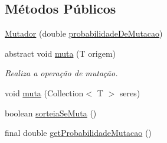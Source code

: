\subsection*{Métodos Públicos}
\begin{DoxyCompactItemize}
\item 
\hyperlink{classic_1_1populacional_1_1algoritmo_1_1operadores_1_1_mutador_3_01_t_01extends_01_ser_01_4_a91f0ac5d3d47ccca5fe3b629bb8db51e}{Mutador} (double \hyperlink{classic_1_1populacional_1_1algoritmo_1_1operadores_1_1_mutador_3_01_t_01extends_01_ser_01_4_a1ef75bbeff32bd2bf0b56c8b2ad86c60}{probabilidade\-De\-Mutacao})
\item 
abstract void \hyperlink{classic_1_1populacional_1_1algoritmo_1_1operadores_1_1_mutador_3_01_t_01extends_01_ser_01_4_a69073efced7c28f34fc78a1406997f68}{muta} (T origem)
\begin{DoxyCompactList}\small\item\em Realiza a operação de mutação. \end{DoxyCompactList}\item 
void \hyperlink{classic_1_1populacional_1_1algoritmo_1_1operadores_1_1_mutador_3_01_t_01extends_01_ser_01_4_a618c8c12d4f4c6fa0a1165b6b255451c}{muta} (Collection$<$ T $>$ seres)
\item 
boolean \hyperlink{classic_1_1populacional_1_1algoritmo_1_1operadores_1_1_mutador_3_01_t_01extends_01_ser_01_4_afd84303577dcfd8bd6bad1f805688413}{sorteia\-Se\-Muta} ()
\item 
final double \hyperlink{classic_1_1populacional_1_1algoritmo_1_1operadores_1_1_mutador_3_01_t_01extends_01_ser_01_4_a2805588bab5915c85a803de4187f6678}{get\-Probabilidade\-Mutacao} ()
\end{DoxyCompactItemize}
